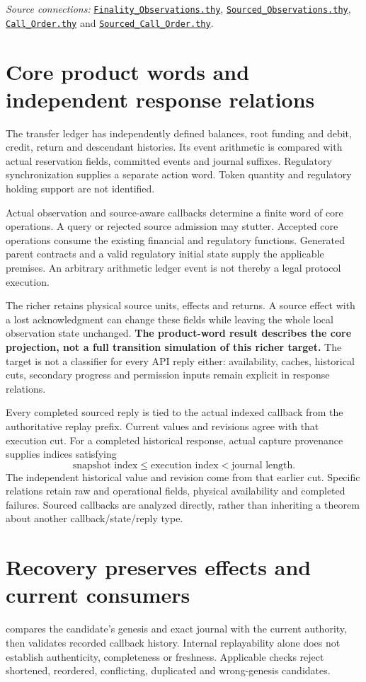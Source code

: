 \documentclass[10pt,a4paper]{article}
\newcommand{\code}[1]{\texttt{\detokenize{#1}}}
\newcommand{\source}[1]{\href{../#1}{\nolinkurl{#1}}}
\begin{document}
\textit{Source connections:} \source{Finality_Observations.thy},
\source{Sourced_Observations.thy}, \source{Call_Order.thy} and
\source{Sourced_Call_Order.thy}.

\clearpage
\section*{Core product words and independent response relations}
The transfer ledger has independently defined balances, root funding and
debit, credit, return and descendant histories. Its event arithmetic is compared
with actual reservation fields, committed events and journal suffixes.
Regulatory synchronization supplies a separate action word. Token quantity
and regulatory holding support are not identified.

Actual observation and source-aware callbacks determine a finite word of core
operations. A query or rejected source admission may stutter. Accepted core
operations consume the existing financial and regulatory functions. Generated
parent contracts and a valid regulatory initial state supply the applicable
premises. An arbitrary arithmetic ledger event is not thereby a legal protocol
execution.

The richer \code{source_observation_alpha} retains physical source units,
effects and returns. A source effect with a lost acknowledgment can change
these fields while leaving the whole local observation state unchanged.
\textbf{The product-word result describes the core projection, not a full
transition simulation of this richer target.} The target is not a classifier
for every API reply either: availability, caches, historical cuts, secondary
progress and permission inputs remain explicit in response relations.

Every completed sourced reply is tied to the actual indexed callback from
the authoritative replay prefix. Current values and revisions agree with that
execution cut. For a completed historical response, actual capture provenance
supplies indices satisfying
\[
  \text{snapshot index}\leq\text{execution index}<\text{journal length}.
\]
The independent historical value and revision come from that earlier cut.
Specific relations retain raw and operational fields, physical availability
and completed failures. Sourced callbacks are analyzed directly, rather than
inheriting a theorem about another callback/state/reply type.

\section*{Recovery preserves effects and current consumers}
\code{checked_current_replay} compares the candidate's genesis and exact
journal with the current authority, then validates recorded callback history.
Internal replayability alone does not establish authenticity, completeness or
freshness. Applicable checks reject shortened, reordered, conflicting,
duplicated and wrong-genesis candidates.
\end{document}
